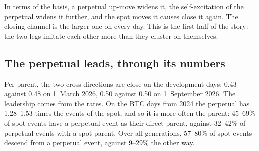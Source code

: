 \documentclass[a4paper,11pt]{article}
\begin{document}
In terms of the basis, a perpetual up-move widens it, the self-excitation of the perpetual widens it further, and the spot moves it causes close it again. The closing channel is the larger one on every day. This is the first half of the story: the two legs imitate each other more than they cluster on themselves.

\subsection{The perpetual leads, through its numbers}

Per parent, the two cross directions are close on the development days: 0.43 against 0.48 on 1~March 2026, 0.50 against 0.50 on 1~September 2026. The leadership comes from the rates. On the BTC days from 2024 the perpetual has 1.28--1.53 times the events of the spot, and so it is more often the parent: 45--69\% of spot events have a perpetual event as their direct parent, against 32--42\% of perpetual events with a spot parent. Over all generations, 57--80\% of spot events descend from a perpetual event, against 9--29\% the other way.
\end{document}
